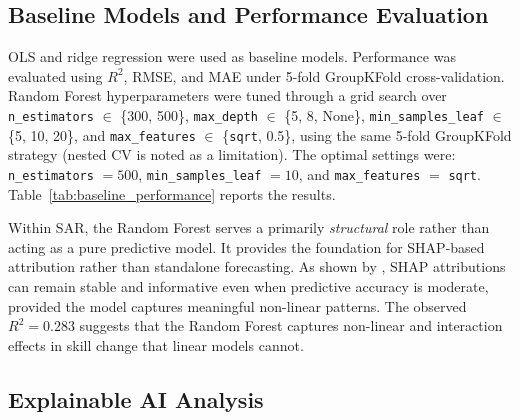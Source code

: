 \documentclass[3p,twocolumn,authoryear]{elsarticle}
\begin{document}
\subsection{Baseline Models and Performance Evaluation}

OLS and ridge regression were used as baseline models. Performance was evaluated
using $R^{2}$, RMSE, and MAE under 5-fold GroupKFold cross-validation. Random
Forest hyperparameters were tuned through a grid search over
\texttt{n\_estimators} $\in$ \{300, 500\},
\texttt{max\_depth} $\in$ \{5, 8, None\},
\texttt{min\_samples\_leaf} $\in$ \{5, 10, 20\}, and
\texttt{max\_features} $\in$ \{\texttt{sqrt}, 0.5\}, using the same 5-fold
GroupKFold strategy (nested CV is noted as a limitation). The optimal settings
were: \texttt{n\_estimators} $= 500$,
\texttt{min\_samples\_leaf} $= 10$, and
\texttt{max\_features} $=$ \texttt{sqrt}.
Table~\ref{tab:baseline_performance} reports the results.

\begin{table}[htbp]
\centering
\caption{5-fold cross-validated model performance ($n = 833$).
Values in parentheses indicate standard deviations across folds.}
\label{tab:baseline_performance}
\end{table}

Within SAR, the Random Forest serves a primarily \textit{structural} role rather
than acting as a pure predictive model. It provides the foundation for
SHAP-based attribution rather than standalone forecasting. As shown by
\citet{lundberg2020}, SHAP attributions can remain stable and informative even
when predictive accuracy is moderate, provided the model captures meaningful
non-linear patterns. The observed $R^{2} = 0.283$ suggests that the Random
Forest captures non-linear and interaction effects in skill change that linear
models cannot.

\subsection{Explainable AI Analysis}
\end{document}
